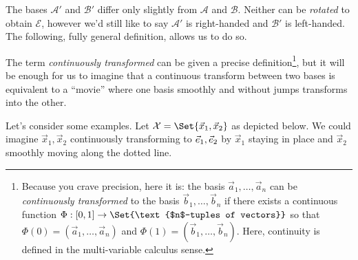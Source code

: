 The bases $\mathcal A'$ and $\mathcal B'$ differ only slightly from $\mathcal A$ and $\mathcal B$. Neither can
be \emph{rotated} to obtain $\mathcal E$, however we'd still like to say $\mathcal A'$ is right-handed and
$\mathcal B'$ is left-handed. The following, fully general definition, allows us to do so.


The term \emph{continuously transformed} can be given a precise definition\footnote{ Because you crave precision, here it is:
the basis $\vec a_1,\ldots, \vec a_n$ can be \emph{continuously transformed} to the basis $\vec b_1,\ldots,\vec b_n$ if there
exists a continuous function $\Phi:[0,1]\to\Set{\text{$n$-tuples of vectors}}$ so that $\Phi(0)=(\vec a_1,\ldots,\vec a_n)$
and $\Phi(1)=(\vec b_1,\ldots,\vec b_n)$. Here, continuity is defined in the multi-variable calculus sense.
}, but it will be enough for us
to imagine that  a continuous transform between two bases is equivalent to a ``movie'' where one
basis smoothly and without jumps transforms into the other.

Let's consider some examples. Let $\mathcal X=\Set{\vec x_1,\vec x_2}$ as depicted below. We could imagine $\vec x_1,\vec x_2$ continuously 
transforming to ${\vec e_1}, {\vec e_2}$ by $\vec x_1$ staying in place and $\vec x_2$ smoothly moving along the dotted
line.

